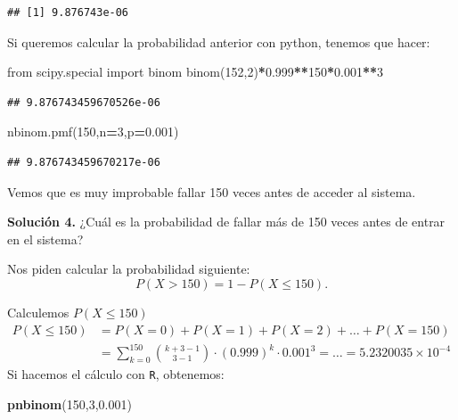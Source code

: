 \documentclass[]{book}
\newenvironment{Shaded}{\begin{snugshade}}{\end{snugshade}}
\newcommand{\DecValTok}[1]{\textcolor[rgb]{0.00,0.00,0.81}{#1}}
\newcommand{\FloatTok}[1]{\textcolor[rgb]{0.00,0.00,0.81}{#1}}
\newcommand{\ImportTok}[1]{#1}
\newcommand{\KeywordTok}[1]{\textcolor[rgb]{0.13,0.29,0.53}{\textbf{#1}}}
\newcommand{\NormalTok}[1]{#1}
\newcommand{\OperatorTok}[1]{\textcolor[rgb]{0.81,0.36,0.00}{\textbf{#1}}}
\begin{document}
\begin{verbatim}
## [1] 9.876743e-06
\end{verbatim}

Si queremos calcular la probabilidad anterior con python, tenemos que hacer:

\begin{Shaded}
\begin{Highlighting}[]
\ImportTok{from}\NormalTok{  scipy.special }\ImportTok{import}\NormalTok{ binom}
\NormalTok{binom(}\DecValTok{152}\NormalTok{,}\DecValTok{2}\NormalTok{)}\OperatorTok{*}\FloatTok{0.999}\OperatorTok{**}\DecValTok{150}\OperatorTok{*}\FloatTok{0.001}\OperatorTok{**}\DecValTok{3}
\end{Highlighting}
\end{Shaded}

\begin{verbatim}
## 9.876743459670526e-06
\end{verbatim}

\begin{Shaded}
\begin{Highlighting}[]
\NormalTok{nbinom.pmf(}\DecValTok{150}\NormalTok{,n}\OperatorTok{=}\DecValTok{3}\NormalTok{,p}\OperatorTok{=}\FloatTok{0.001}\NormalTok{)}
\end{Highlighting}
\end{Shaded}

\begin{verbatim}
## 9.876743459670217e-06
\end{verbatim}

Vemos que es muy improbable fallar 150 veces antes de acceder al sistema.

\textbf{Solución 4.} ¿Cuál es la probabilidad de fallar más de 150 veces antes de entrar en el sistema?

Nos piden calcular la probabilidad siguiente:
\[P(X>150)=1-P(X\leq 150).\]

Calculemos \(P(X\leq 150)\)
\[
\begin{array}{rl}
P(X\leq 150) &= P(X=0)+P(X=1)+P(X=2)+\ldots+P(X=150) \\ & = \sum\limits_{k=0}^{150} {k+3-1\choose 3-1} \cdot (0.999)^{k}\cdot 0.001^3= \ldots = \ensuremath{5.2320035\times 10^{-4}}
\end{array}
\]
Si hacemos el cálculo con \texttt{R}, obtenemos:

\begin{Shaded}
\begin{Highlighting}[]
\KeywordTok{pnbinom}\NormalTok{(}\DecValTok{150}\NormalTok{,}\DecValTok{3}\NormalTok{,}\FloatTok{0.001}\NormalTok{)}
\end{Highlighting}
\end{Shaded}
\end{document}
